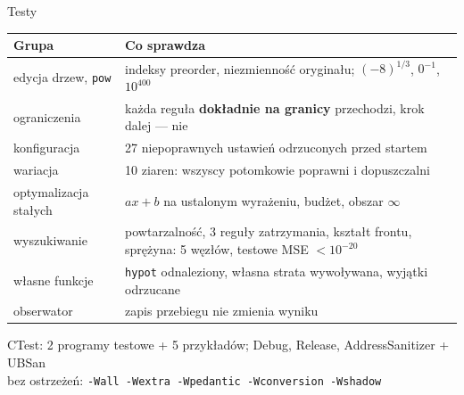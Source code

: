 \documentclass[aspectratio=169,11pt]{beamer}
\begin{document}
\begin{frame}{Testy}
  \small
  \begin{tabular}{@{}p{} p{}@{}}
    \toprule
    Grupa & Co sprawdza \\ \midrule
    edycja drzew, \texttt{pow} & indeksy preorder, niezmienność oryginału; $(-8)^{1/3}$, $0^{-1}$, $10^{400}$ \\
    ograniczenia & każda reguła \textbf{dokładnie na granicy} przechodzi, krok dalej --- nie \\
    konfiguracja & 27 niepoprawnych ustawień odrzuconych przed startem \\
    wariacja & 10 ziaren: wszyscy potomkowie poprawni i dopuszczalni \\
    optymalizacja stałych & $a x + b$ na ustalonym wyrażeniu, budżet, obszar $\infty$ \\
    wyszukiwanie & powtarzalność, 3 reguły zatrzymania, kształt frontu, sprężyna: 5 węzłów, testowe MSE $< 10^{-20}$ \\
    własne funkcje & \texttt{hypot} odnaleziony, własna strata wywoływana, wyjątki odrzucane \\
    obserwator & zapis przebiegu nie zmienia wyniku \\
    \bottomrule
  \end{tabular}\par\medskip
  CTest: 2 programy testowe + 5 przykładów; Debug, Release, AddressSanitizer + UBSan\\
  bez ostrzeżeń: \texttt{-Wall -Wextra -Wpedantic -Wconversion -Wshadow}
\end{frame}
\end{document}
